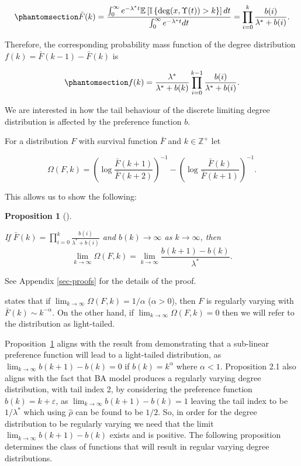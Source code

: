 \documentclass[
  sn-basic,
]{sn-jnl}
\theoremstyle{plain}
\newtheorem{proposition}{Proposition}[section]
\theoremstyle{plain}
\theoremstyle{remark}
\begin{document}
\begin{equation}\phantomsection\label{eq-surv-origin}{
\bar F(k) = \frac{\int_0^\infty e^{-\lambda^* t}\mathbb E\left[\mathbb I\left\{\text{deg}(x,\Upsilon(t))>k\right\}\right]dt}{\int_0^\infty e^{-\lambda^* t}dt} = \prod_{i=0}^k\frac{b(i)}{\lambda^* + b(i)}.
}\end{equation}

Therefore, the corresponding probability mass function of the degree
distribution \(f(k) = \bar F(k-1) - \bar F(k)\) is

\begin{equation}\phantomsection\label{eq-pmf-origin}{
f(k) = \frac{\lambda^*}{\lambda^* + b(k)}\prod_{i=0}^{k-1}\frac{b(i)}{\lambda^*+b(i)}.
}\end{equation}

We are interested in how the tail behaviour of the discrete limiting
degree distribution is affected by the preference function \(b\).

For a distribution \(F\) with survival function \(\bar F\) and
\(k\in\mathbb Z^+\) let

\[
\Omega(F,k) = \left(\log\displaystyle\frac{\bar F (k+1)}{\bar F (k+2)}\right)^{-1} - \left(\log\displaystyle\frac{\bar F (k)}{\bar F (k+1)}\right)^{-1}.
\]

This allows us to show the following:

\begin{proposition}[]\protect\hypertarget{prp-omega}{}\label{prp-omega}

If \(\bar F(k) = \prod_{i=0}^k\frac{b(i)}{\lambda^* + b(i)}\) and
\(b(k) \rightarrow \infty\) as \(k\rightarrow \infty\), then \[
\lim_{k\rightarrow\infty}\Omega(F,k) = \lim_{k\rightarrow\infty}\frac{b(k+1)-b(k)}{\lambda^*}.
\]

\end{proposition}

See Appendix \ref{sec-proofs} for the details of the proof.

\citet{shimura12} states that if
\(\lim_{k\rightarrow\infty} \Omega(F,k) = 1/\alpha\) (\(\alpha>0\)),
then \(F\) is regularly varying with \(\bar F(k) \sim k^{-\alpha}\). On
the other hand, if \(\lim_{k\rightarrow\infty} \Omega(F,k) = 0\) then we
will refer to the distribution as light-tailed.

Proposition~\ref{prp-omega} aligns with the result from
\citet{krapivsky01} demonstrating that a sub-linear preference function
will lead to a light-tailed distribution, as
\(\lim_{k\rightarrow\infty} b(k+1)-b(k) = 0\) if \(b(k)=k^\alpha\) where
\(\alpha < 1\). Proposition 2.1 also aligns with the fact that BA model
produces a regularly varying degree distribution, with tail index 2, by
considering the preference function \(b(k) = k + \varepsilon\), as
\(\lim_{k\rightarrow\infty}b(k+1)-b(k)=1\) leaving the tail index to be
\(1/\lambda^*\) which using \(\hat\rho\) can be found to be \(1/2\). So,
in order for the degree distribution to be regularly varying we need
that the limit \(\lim_{k\rightarrow\infty} b(k+1)-b(k)\) exists and is
positive. The following proposition determines the class of functions
that will result in regular varying degree distributions.
\end{document}
